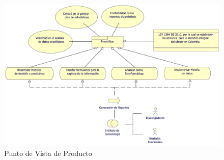 \begin{figure}[h!]
	\centering
	\includegraphics[width=1\linewidth]{ARQUITECTURA/imgs/CapaNegocio/6_PvProducto}
	\caption{Punto de Vista de Producto}
	\label{PvProducto}
\end{figure}

